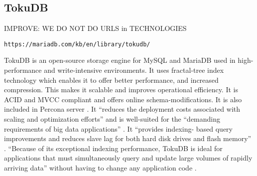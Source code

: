 \subsection{TokuDB}

IMPROVE: WE DO NOT DO URLS in TECHNOLOGIES

\verb|https://mariadb.com/kb/en/library/tokudb/|
 
TokuDB is an open-source storage engine for MySQL and MariaDB used in high-
performance and write-intensive environments. It uses fractal-tree index 
technology which enables it to offer better performance, and increased compression. 
This makes it scalable and improves operational efficiency. It is ACID and MVCC 
compliant and offers online schema-modifications. It is also included in Percona 
server \cite{www-wikipedia}. It “reduces the deployment costs associated with 
scaling and optimization efforts” and is well-suited for the “demanding 
requirements of big data applications” \cite{www-percona}. It “provides indexing-
based query improvements and reduces slave lag for both hard disk drives and flash 
memory” \cite{www-wikipedia}. “Because of its exceptional indexing performance, 
TokuDB is ideal for applications that must simultaneously query and update large 
volumes of rapidly arriving data” without having to change any application code 
\cite{blackbird-si}.

